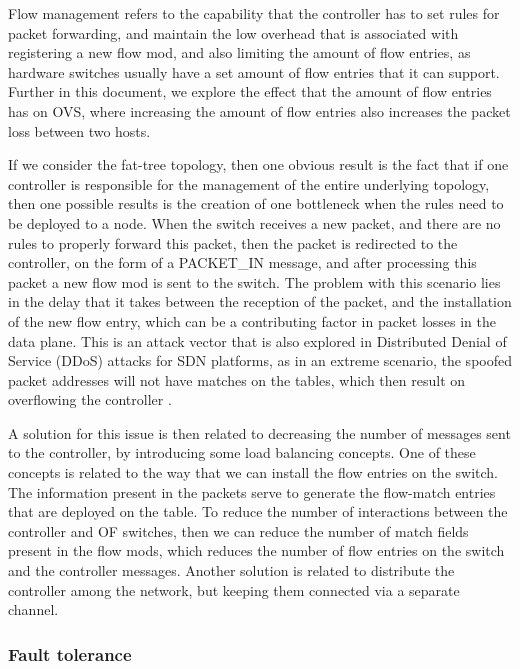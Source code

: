 Flow management refers to the capability that the controller has to set rules for packet forwarding, and maintain the low overhead that is associated with registering a new flow mod, and also limiting the amount of flow entries, 
as hardware switches usually have a set amount of flow entries that it can support. Further in this document, we explore the effect that the amount of flow entries has on OVS, where increasing the amount of flow entries also 
increases the packet loss between two hosts.
\par If we consider the fat-tree topology, then one obvious result is the fact that if one controller is responsible for the management of the entire underlying topology, then one possible results is the creation of one bottleneck
when the rules need to be deployed to a node. When the switch receives a new packet, and there are no rules to properly forward this packet, then the packet is redirected to the controller, on the form of a \textsc{PACKET\_IN} 
message, and after processing this packet a new flow mod is sent to the switch. The problem with this scenario lies in the delay that it takes between the reception of the packet, and the installation of the new
flow entry, which can be a contributing factor in packet losses in the data plane. This is an attack vector that is also explored in Distributed Denial of Service (DDoS) attacks for SDN platforms, as in an extreme scenario,
the spoofed packet addresses will not have matches on the tables, which then result on overflowing the controller \cite {early_detection_sdn_ddos}.
\par A solution for this issue is then related to decreasing the number of messages sent to the controller, by introducing some load balancing concepts. One of these concepts is related to the way that we can install the flow 
entries on the switch. The information present in the packets serve to generate the flow-match entries that are deployed on the table. To reduce the number of interactions between the controller and OF switches, then we can 
reduce the number of match fields present in the flow mods, which reduces the number of flow entries on the switch and the controller messages. Another solution is related to distribute the controller among the network, 
but keeping them connected via a separate channel.

\subsubsection {Fault tolerance} \label{sec:fault_tolerance}

